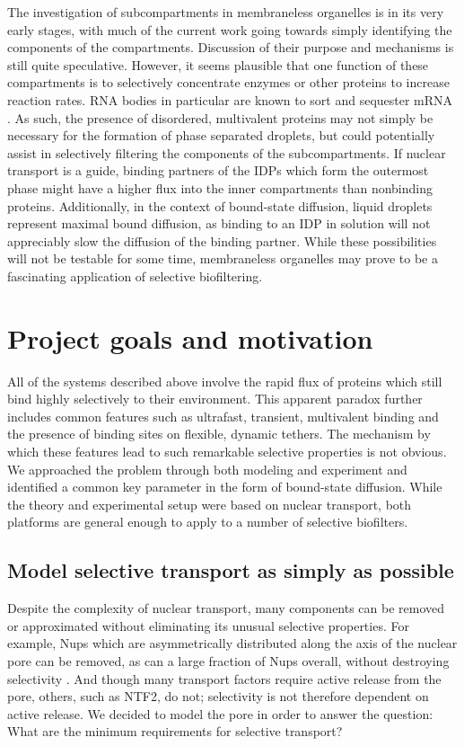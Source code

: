 The investigation of subcompartments in membraneless organelles is in its very early stages, with much of the current work going towards simply identifying the components of the compartments.  Discussion of their purpose and mechanisms is still quite speculative.  However, it seems plausible that one function of these compartments is to selectively concentrate enzymes or other proteins to increase reaction rates.  RNA bodies in particular are known to sort and sequester mRNA \cite{shiina19}.  As such, the presence of disordered, multivalent proteins may not simply be necessary for the formation of phase separated droplets, but could potentially assist in selectively filtering the components of the subcompartments.  If nuclear transport is a guide, binding partners of the IDPs which form the outermost phase might have a higher flux into the inner compartments than nonbinding proteins.  Additionally, in the context of bound-state diffusion, liquid droplets represent maximal bound diffusion, as binding to an IDP in solution will not appreciably slow the diffusion of the binding partner.  While these possibilities will not be testable for some time, membraneless organelles may prove to be a fascinating application of selective biofiltering.

\section{Project goals and motivation}

All of the systems described above involve the rapid flux of proteins which still bind highly selectively to their environment.  This apparent paradox further includes common features such as ultrafast, transient, multivalent binding and the presence of binding sites on flexible, dynamic tethers.  The mechanism by which these features lead to such remarkable selective properties is not obvious.  We approached the problem through both modeling and experiment and identified a common key parameter in the form of bound-state diffusion.  While the theory and experimental setup were based on nuclear transport, both platforms are general enough to apply to a number of selective biofilters.

\subsection{Model selective transport as simply as possible}

Despite the complexity of nuclear transport, many components can be removed or approximated without eliminating its unusual selective properties.   For example, Nups which are asymmetrically distributed along the axis of the nuclear pore can be removed, as can a large fraction of Nups overall, without destroying selectivity \cite{strawn04, zeitler04,kowalczyk11, jovanovic-talisman09}.  And though many transport factors require active release from the pore, others, such as NTF2, do not; selectivity is not therefore dependent on active release.  We decided to model the pore in order to answer the question: What are the minimum requirements for selective transport?

